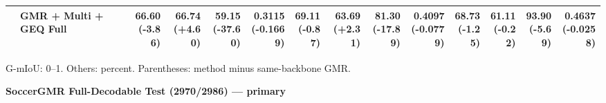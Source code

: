 \documentclass{article}
\begin{document}
{\begin{tabular}{llrrrrrrrrrrrr}
 & GMR + Multi + GEQ Full & \shortstack{66.60 \\ {\scriptsize\textcolor{Loss}{(-3.86)}}} & \shortstack{66.74 \\ {\scriptsize\textcolor{Gain}{(+4.60)}}} & \shortstack{59.15 \\ {\scriptsize\textcolor{Loss}{(-37.60)}}} & \shortstack{0.3115 \\ {\scriptsize\textcolor{Loss}{(-0.1669)}}} & \shortstack{69.11 \\ {\scriptsize\textcolor{Loss}{(-0.87)}}} & \shortstack{63.69 \\ {\scriptsize\textcolor{Gain}{(+2.31)}}} & \shortstack{81.30 \\ {\scriptsize\textcolor{Loss}{(-17.89)}}} & \shortstack{0.4097 \\ {\scriptsize\textcolor{Loss}{(-0.0779)}}} & \shortstack{68.73 \\ {\scriptsize\textcolor{Loss}{(-1.25)}}} & \shortstack{61.11 \\ {\scriptsize\textcolor{Loss}{(-0.22)}}} & \shortstack{93.90 \\ {\scriptsize\textcolor{Loss}{(-5.69)}}} & \shortstack{0.4637 \\ {\scriptsize\textcolor{Loss}{(-0.0258)}}} \\
\bottomrule\end{tabular}}\par
G-mIoU: 0--1. Others: percent. Parentheses: method minus same-backbone GMR.\par
\newpage
\noindent\textbf{SoccerGMR Full-Decodable Test (2970/2986) — primary}\par
\end{document}
